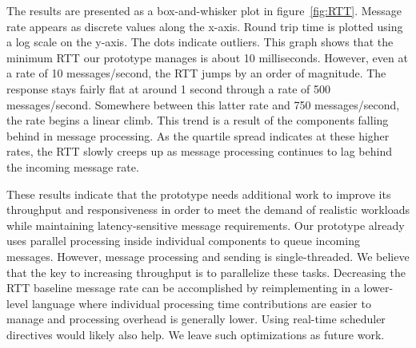 The results are presented as a box-and-whisker plot in
figure~\ref{fig:RTT}. Message rate appears as discrete values along
the x-axis. Round trip time is plotted using a log scale on the
y-axis. The dots indicate outliers. This graph shows that the minimum
RTT our prototype manages is about 10 milliseconds. However, even at a
rate of 10 messages/second, the RTT jumps by an order of
magnitude. The response stays fairly flat at around 1 second through a
rate of 500 messages/second. Somewhere between this latter rate and
750 messages/second, the rate begins a linear climb.  This trend is a
result of the \name{} components falling behind in message processing.
As the quartile spread indicates at these higher rates, the RTT slowly
creeps up as message processing continues to lag behind the incoming
message rate.

These results indicate that the prototype needs additional work to
improve its throughput and responsiveness in order to meet the demand
of realistic workloads while maintaining latency-sensitive message
requirements.  Our prototype already uses parallel processing inside
individual components to queue incoming messages.  However, message
processing and sending is single-threaded.  We believe that the key to
increasing throughput is to parallelize these tasks. Decreasing the
RTT baseline message rate can be accomplished by reimplementing
\name{} in a lower-level language where individual processing time
contributions are easier to manage and processing overhead is
generally lower.  Using real-time scheduler directives would likely
also help. We leave such optimizations as future work.

